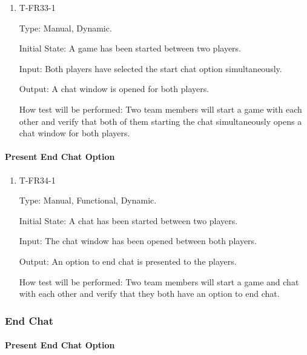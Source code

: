 \documentclass[12pt, titlepage]{article}
\begin{document}
        \begin{enumerate}

        \item{T-FR33-1\\}

            Type: Manual, Dynamic.
            					
            Initial State: A game has been started between two players.
            					
            Input: Both players have selected the start chat option simultaneously.
            					
            Output: A chat window is opened for both players.

            How test will be performed: Two team members will start a game with each other and verify that both of them starting the chat simultaneously opens a chat window for both players.

        \end{enumerate}
        
    \paragraph{Present End Chat Option}

        \begin{enumerate}

        \item{T-FR34-1\\}

            Type: Manual, Functional, Dynamic.
            					
            Initial State: A chat has been started between two players.
            					
            Input: The chat window has been opened between both players.
            					
            Output: An option to end chat is presented to the players.

            How test will be performed: Two team members will start a game and chat with each other and verify that they both have an option to end chat.

        \end{enumerate}
        
\subsubsection{End Chat}
		
    \paragraph{Present End Chat Option}
\end{document}

